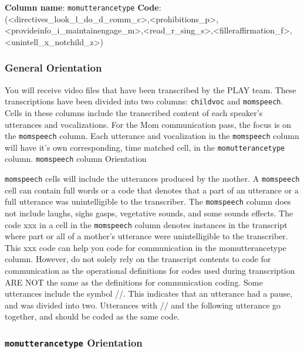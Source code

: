 \documentclass[
]{book}
\begin{document}
\textbf{Column name}: \texttt{momutterancetype}
\textbf{Code}: (\textless directives\_look\_l\_do\_d\_comm\_c\textgreater,\textless prohibitions\_p\textgreater,\textless provideinfo\_i\_maintainengage\_m\textgreater,\textless read\_r\_sing\_s\textgreater,\textless filleraffirmation\_f\textgreater,\textless unintell\_x\_notchild\_z\textgreater)

\hypertarget{general-orientation}{%
\subsubsection*{General Orientation}\label{general-orientation}}

You will receive video files that have been transcribed by the PLAY team. These transcriptions have been divided into two columns: \texttt{childvoc} and \texttt{momspeech}. Cells in these columns include the transcribed content of each speaker's utterances and vocalizations. For the Mom communication pass, the focus is on the \texttt{momspeech} column. Each utterance and vocalization in the \texttt{momspeech} column will have it's own corresponding, time matched cell, in the \texttt{momutterancetype} column.
\texttt{momspeech} column Orientation

\texttt{momspeech} cells will include the utterances produced by the mother. A \texttt{momspeech} cell can contain full words or a code that denotes that a part of an utterance or a full utterance was unintelligible to the transcriber. The \texttt{momspeech} column does not include laughs, sighs gasps, vegetative sounds, and some sounds effects.
The code xxx in a cell in the \texttt{momspeech} column denotes instances in the transcript where part or all of a mother's utterance were unintelligible to the transcriber. This xxx code can help you code for communication in the momutterancetype column. However, do not solely rely on the transcript contents to code for communication as the operational definitions for codes used during transcription ARE NOT the same as the definitions for communication coding.
Some utterances include the symbol //. This indicates that an utterance had a pause, and was divided into two. Utterances with // and the following utterance go together, and should be coded as the same code.

\hypertarget{momutterancetype-orientation}{%
\subsubsection*{\texorpdfstring{\texttt{momutterancetype} Orientation}{momutterancetype Orientation}}\label{momutterancetype-orientation}}
\end{document}
